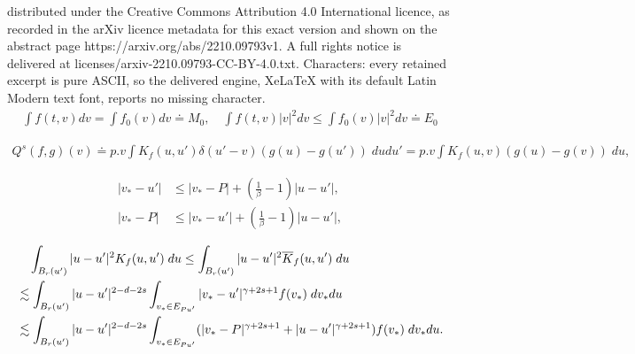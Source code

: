 \documentclass[10pt,a4paper]{amsart}
\begin{document}
distributed under the Creative Commons Attribution 4.0 International licence, as recorded in the arXiv licence metadata for this exact version and shown on the abstract page https://arxiv.org/abs/2210.09793v1. A full rights notice is delivered at licenses/arxiv-2210.09793-CC-BY-4.0.txt. Characters: every retained excerpt is pure ASCII, so the delivered engine, XeLaTeX with its default Latin Modern text font, reports no missing character.
\begin{align} \label{hydro_I}
    \int f(t,v) dv = \int f_0(v) dv \doteq M_0,\quad \int f(t,v)|v|^2 dv \leq \int f_0(v)|v|^2 dv \doteq E_0
\end{align} 

\begin{align} \label{Qs_Kf_nc_I}
Q^{s}(f,g)(v) 
\doteq p.v\int K_f(u,u')\delta(u'-v)(g(u)-g(u')) \;dudu'
= p.v\int K_f(u,v)(g(u)-g(v)) \;du,
\end{align}

\begin{align} 
    |v_*-u'| &\leq |v_*-P|+(\frac{1}{\beta}-1)|u-u'|, \label{tri_inequ_Kf_est_I} \\
    |v_*-P| &\leq |v_*-u'|+(\frac{1}{\beta}-1)|u-u'|, \label{tri_inequ_Kf_est_I'} 
\end{align}

\begin{align}
&\quad\int_{B_{r}(u')}|u-u'|^2K_f(u,u')\; du \leq \int_{B_{r}(u')}|u-u'|^2\overline{K}_{f}(u,u')\; du \notag \\
&\lesssim
     \int_{B_{r}(u')}|u-u'|^{2-d-2s} \int_{v_*\in E_{Pu'}}|v_*-u'|^{\gamma+2s+1}f(v_*) \; dv_*du \notag \\
     &\lesssim
     \int_{B_{r}(u')}|u-u'|^{2-d-2s} \int_{v_*\in E_{Pu'}}(|v_*-P|^{\gamma+2s+1}+|u-u'|^{\gamma+2s+1})f(v_*) \; dv_*du. \label{Kf_est_I_tri_1}
\end{align}
\end{document}
